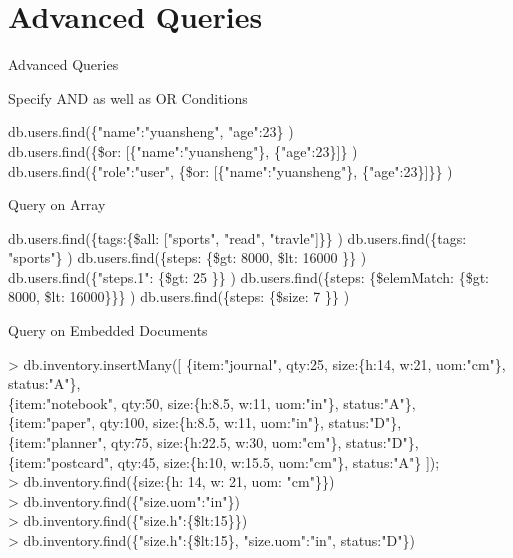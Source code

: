 \documentclass{beamer}
\begin{document}
\section{Advanced Queries}
\begin{frame}{Advanced Queries}
	\scriptsize
	\begin{block}{Specify AND as well as OR Conditions}
		\begin{Alms*}
			db.users.find(\NI \{"name":"yuansheng", "age":23\} \ND) \\
			db.users.find(\NI \{\$or: [\{"name":"yuansheng"\}, \{"age":23\}]\} \ND)
			db.users.find(\NI \{"role":"user", \{\$or: [\{"name":"yuansheng"\}, \{"age":23\}]\}\} \ND)
		\end{Alms*}
	\end{block}

	\begin{block}{Query on Array}
		\begin{Alms*}
			db.users.find(\NI \{tags:\{\$all: ["sports", "read", "travle"]\}\} \ND)
			db.users.find(\NI \{tags: "sports"\} \ND)
			db.users.find(\NI \{steps: \{\$gt: 8000, \$lt: 16000 \}\} \ND)
			db.users.find(\NI \{"steps.1": \{\$gt: 25 \}\} \ND)
			db.users.find(\NI \{steps: \{\$elemMatch: \{\$gt: 8000, \$lt: 16000\}\}\} \ND)
			db.users.find(\NI \{steps: \{\$size: 7 \}\} \ND)
		\end{Alms*}
	\end{block}

\end{frame}

\begin{frame}{Query on Embedded Documents}
	\scriptsize
	\begin{Alms*}
		> db.inventory.insertMany([ \NI
		\{item:"journal", qty:25, size:\{h:14, w:21, uom:"cm"\}, status:"A"\}, \\
		\{item:"notebook", qty:50, size:\{h:8.5, w:11, uom:"in"\}, status:"A"\}, \\
		\{item:"paper", qty:100, size:\{h:8.5, w:11, uom:"in"\}, status:"D"\}, \\
		\{item:"planner", qty:75, size:\{h:22.5, w:30, uom:"cm"\}, status:"D"\}, \\
		\{item:"postcard", qty:45, size:\{h:10, w:15.5, uom:"cm"\}, status:"A"\}
		\ND]);\\
		> db.inventory.find(\{size:\{h: 14, w: 21, uom: "cm"\}\}) \\
		> db.inventory.find(\{"size.uom":"in"\}) \\
		> db.inventory.find(\{"size.h":\{\$lt:15\}\}) \\
		> db.inventory.find(\{"size.h":\{\$lt:15\}, "size.uom":"in", status:"D"\})
	\end{Alms*}
\end{frame}
\end{document}
